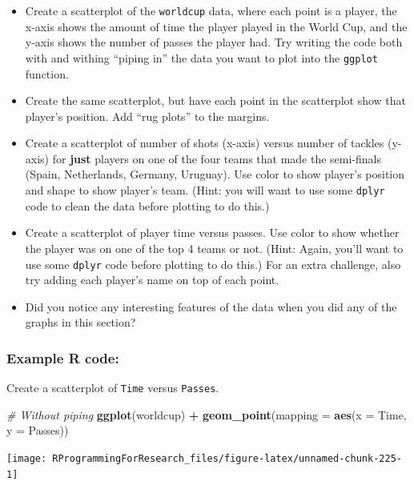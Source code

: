 \documentclass[]{book}
\makeatletter
\newenvironment{Shaded}{\begin{snugshade}}{\end{snugshade}}
\newcommand{\KeywordTok}[1]{\textcolor[rgb]{0.13,0.29,0.53}{\textbf{#1}}}
\newcommand{\DataTypeTok}[1]{\textcolor[rgb]{0.13,0.29,0.53}{#1}}
\newcommand{\StringTok}[1]{\textcolor[rgb]{0.31,0.60,0.02}{#1}}
\newcommand{\CommentTok}[1]{\textcolor[rgb]{0.56,0.35,0.01}{\textit{#1}}}
\newcommand{\OperatorTok}[1]{\textcolor[rgb]{0.81,0.36,0.00}{\textbf{#1}}}
\newcommand{\NormalTok}[1]{#1}
\providecommand{\tightlist}{%
  \setlength{\itemsep}{0pt}\setlength{\parskip}{0pt}}
\newenvironment{kframe}{%
\medskip{}
\setlength{\fboxsep}{.8em}
 \def\at@end@of@kframe{}%
 \ifinner\ifhmode%
  \def\at@end@of@kframe{\end{minipage}}%
  \begin{minipage}{\columnwidth}%
 \fi\fi%
 \def\FrameCommand##1{\hskip\@totalleftmargin \hskip-\fboxsep
 \colorbox{shadecolor}{##1}\hskip-\fboxsep
     \hskip-\linewidth \hskip-\@totalleftmargin \hskip\columnwidth}%
 \MakeFramed {\advance\hsize-\width
   \@totalleftmargin\z@ \linewidth\hsize
   \@setminipage}}%
 {\par\unskip\endMakeFramed%
 \at@end@of@kframe}
\renewenvironment{Shaded}{\begin{kframe}}{\end{kframe}}
\theoremstyle{definition}
\theoremstyle{definition}
\theoremstyle{definition}
\theoremstyle{remark}
\makeatother
\begin{document}
\begin{itemize}
\tightlist
\item
  Create a scatterplot of the \texttt{worldcup} data, where each point
  is a player, the x-axis shows the amount of time the player played in
  the World Cup, and the y-axis shows the number of passes the player
  had. Try writing the code both with and withing ``piping in'' the data
  you want to plot into the \texttt{ggplot} function.
\item
  Create the same scatterplot, but have each point in the scatterplot
  show that player's position. Add ``rug plots'' to the margins.
\item
  Create a scatterplot of number of shots (x-axis) versus number of
  tackles (y-axis) for \textbf{just} players on one of the four teams
  that made the semi-finals (Spain, Netherlands, Germany, Uruguay). Use
  color to show player's position and shape to show player's team.
  (Hint: you will want to use some \texttt{dplyr} code to clean the data
  before plotting to do this.)
\item
  Create a scatterplot of player time versus passes. Use color to show
  whether the player was on one of the top 4 teams or not. (Hint: Again,
  you'll want to use some \texttt{dplyr} code before plotting to do
  this.) For an extra challenge, also try adding each player's name on
  top of each point.
\item
  Did you notice any interesting features of the data when you did any
  of the graphs in this section?
\end{itemize}

\subsubsection{Example R code:}\label{example-r-code-3}

Create a scatterplot of \texttt{Time} versus \texttt{Passes}.

\begin{Shaded}
\begin{Highlighting}[]
\CommentTok{# Without piping}
\KeywordTok{ggplot}\NormalTok{(worldcup) }\OperatorTok{+}\StringTok{ }
\StringTok{  }\KeywordTok{geom_point}\NormalTok{(}\DataTypeTok{mapping =} \KeywordTok{aes}\NormalTok{(}\DataTypeTok{x =}\NormalTok{ Time, }\DataTypeTok{y =}\NormalTok{ Passes))}
\end{Highlighting}
\end{Shaded}

\begin{center}\texttt{[image: RProgrammingForResearch\_files/figure-latex/unnamed-chunk-225-1]} \end{center}
\end{document}
